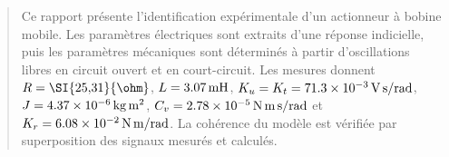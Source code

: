 \begin{abstract}
Ce rapport présente l'identification expérimentale d'un actionneur à bobine mobile. Les paramètres électriques sont extraits d'une réponse indicielle, puis les paramètres mécaniques sont déterminés à partir d'oscillations libres en circuit ouvert et en court-circuit. Les mesures donnent \(R=\SI{25{,}31}{\ohm}\), \(L=\SI{3{,}07}{mH}\), \(K_u=K_t=\SI{71{,}3e-3}{V.s/rad}\), \(J=\SI{4{,}37e-6}{kg.m^2}\), \(C_v=\SI{2{,}78e-5}{N.m.s/rad}\) et \(K_r=\SI{6{,}08e-2}{N.m/rad}\). La cohérence du modèle est vérifiée par superposition des signaux mesurés et calculés.
\end{abstract}
